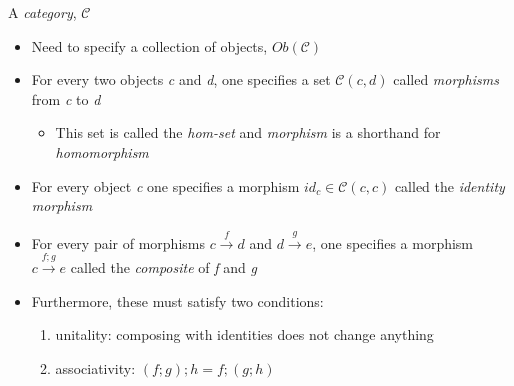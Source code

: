 A \emph{category}, $\mathcal{C}$

\begin{itemize}
    \item Need to specify a collection of objects, $Ob(\mathcal{C})$
    \item For every two objects \emph{c} and \emph{d}, one specifies a set $\mathcal{C}(c,d)$ called \emph{morphisms} from \emph{c} to \emph{d}
          \begin{itemize}
            \item This set is called the \emph{hom-set} and \emph{morphism} is a shorthand for \emph{homomorphism}
          \end{itemize}
    \item For every object \emph{c} one specifies a morphism $id_c \in \mathcal{C}(c,c)$ called the \emph{identity morphism}
    \item For every pair of morphisms $c \xrightarrow{f} d$ and $d \xrightarrow{g} e$, one specifies a morphism $c \xrightarrow{f;g}e$ called the \emph{composite} of \emph{f} and \emph{g}
    \item Furthermore, these must satisfy two conditions:
          \begin{enumerate}
            \item unitality: composing with identities does not change anything
            \item associativity: $(f;g);h = f;(g;h)$
          \end{enumerate}
  \end{itemize}

